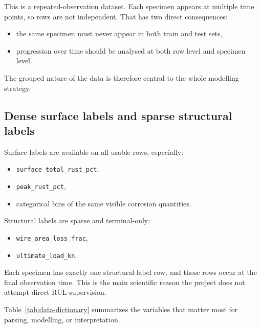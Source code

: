 \documentclass[10pt,a4paper,twocolumn]{article}
\begin{document}
This is a repeated-observation dataset. Each specimen appears at multiple time points, so rows are not independent. That has two direct consequences:

\begin{itemize}
    \item the same specimen must never appear in both train and test sets,
    \item progression over time should be analysed at both row level and specimen level.
\end{itemize}

The grouped nature of the data is therefore central to the whole modelling strategy.

\subsection{Dense surface labels and sparse structural labels}

Surface labels are available on all usable rows, especially:

\begin{itemize}
    \item \texttt{surface\_total\_rust\_pct},
    \item \texttt{peak\_rust\_pct},
    \item categorical bins of the same visible corrosion quantities.
\end{itemize}

Structural labels are sparse and terminal-only:

\begin{itemize}
    \item \texttt{wire\_area\_loss\_frac},
    \item \texttt{ultimate\_load\_kn}.
\end{itemize}

Each specimen has exactly one structural-label row, and those rows occur at the final observation time. This is the main scientific reason the project does not attempt direct RUL supervision.

Table~\ref{tab:data-dictionary} summarizes the variables that matter most for parsing, modelling, or interpretation.
\end{document}
